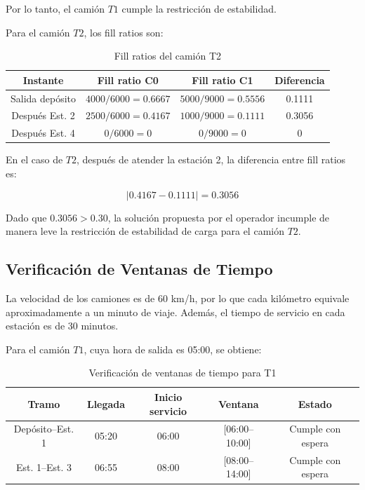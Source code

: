 Por lo tanto, el camión $T1$ cumple la restricción de estabilidad.

Para el camión $T2$, los fill ratios son:

\begin{table}[H]
\centering
\caption{Fill ratios del camión T2}
\begin{tabular}{cccc}
\toprule
Instante & Fill ratio C0 & Fill ratio C1 & Diferencia \\
\midrule
Salida depósito & $4000/6000 = 0.6667$ & $5000/9000 = 0.5556$ & 0.1111 \\
Después Est. 2 & $2500/6000 = 0.4167$ & $1000/9000 = 0.1111$ & 0.3056 \\
Después Est. 4 & $0/6000 = 0$ & $0/9000 = 0$ & 0 \\
\bottomrule
\end{tabular}
\end{table}

En el caso de $T2$, después de atender la estación 2, la diferencia entre fill ratios es:

\begin{equation*}
|0.4167 - 0.1111| = 0.3056
\end{equation*}

Dado que $0.3056 > 0.30$, la solución propuesta por el operador incumple de manera leve la restricción de estabilidad de carga para el camión $T2$.

\subsection{Verificación de Ventanas de Tiempo}


La velocidad de los camiones es de 60 km/h, por lo que cada kilómetro equivale aproximadamente a un minuto de viaje. Además, el tiempo de servicio en cada estación es de 30 minutos.

Para el camión $T1$, cuya hora de salida es 05:00, se obtiene:

\begin{table}[H]
\centering
\caption{Verificación de ventanas de tiempo para T1}
\begin{tabular}{ccccc}
\toprule
Tramo & Llegada & Inicio servicio & Ventana & Estado \\
\midrule
Depósito--Est. 1 & 05:20 & 06:00 & [06:00--10:00] & Cumple con espera \\
Est. 1--Est. 3 & 06:55 & 08:00 & [08:00--14:00] & Cumple con espera \\
\bottomrule
\end{tabular}
\end{table}

